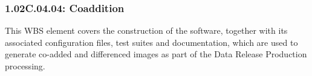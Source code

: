 \subsubsection*{1.02C.04.04: Coaddition}

This WBS element covers the construction of the software,
together with its associated configuration files, test suites and
documentation, which are used to generate co-added and differenced
images as part of the Data Release Production processing.
